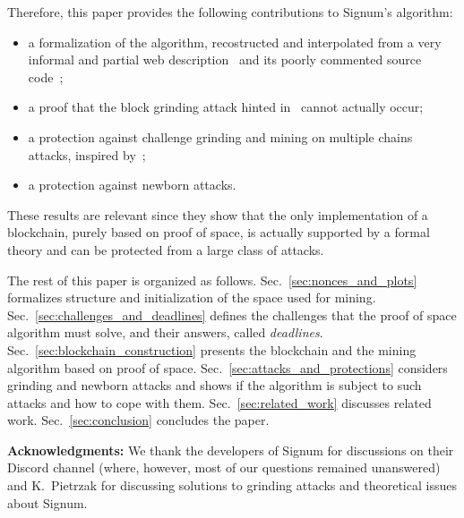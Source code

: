 Therefore, this paper provides the following contributions to Signum's algorithm:
%
\begin{itemize}
\item a formalization of the algorithm, recostructed and interpolated from a very informal and partial
  web description~\cite{SignumPlotting} and its poorly commented source code~\cite{SignumSource};
\item a proof that the block grinding attack hinted in~\cite{ParkKFGAP18} cannot actually occur;
\item a protection against challenge grinding and mining on multiple chains attacks, inspired by~\cite{ParkKFGAP18};
\item a protection against newborn attacks.
\end{itemize}
%
These results are relevant since they show that the only implementation
of a blockchain, purely based on proof of space, is actually supported by a formal theory
and can be protected from a large class of attacks.

The rest of this paper is organized as follows.
Sec.~\ref{sec:nonces_and_plots} formalizes structure and initialization of the space used for mining.
Sec.~\ref{sec:challenges_and_deadlines} defines the challenges that the proof of space
algorithm must solve, and their answers, called \emph{deadlines}.
Sec.~\ref{sec:blockchain_construction} presents the blockchain and the mining algorithm
based on proof of space.
Sec.~\ref{sec:attacks_and_protections} considers grinding and newborn attacks and
shows if the algorithm is subject to such attacks and how to cope with them.
Sec.~\ref{sec:related_work} discusses related work.
Sec.~\ref{sec:conclusion} concludes the paper.

\vspace*{1ex}
\textbf{Acknowledgments:}
We thank the developers of Signum for discussions on their Discord channel (where, however, most
of our questions remained unanswered) and K.\ Pietrzak for discussing solutions to
grinding attacks and theoretical issues about Signum.

